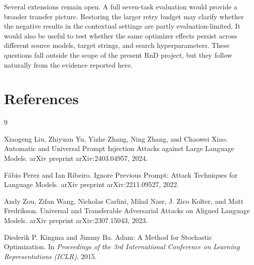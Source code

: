 \documentclass[12pt,a4paper]{report}
\begin{document}
Several extensions remain open. A full seven-task evaluation would provide a broader transfer picture. Restoring the larger retry budget may clarify whether the negative results in the contextual settings are partly evaluation-limited. It would also be useful to test whether the same optimizer effects persist across different source models, target strings, and search hyperparameters. These questions fall outside the scope of the present RnD project, but they follow naturally from the evidence reported here.

\chapter*{References}
\begin{thebibliography}{9}

Xiaogeng Liu, Zhiyuan Yu, Yizhe Zhang, Ning Zhang, and Chaowei Xiao.
\newblock Automatic and Universal Prompt Injection Attacks against Large Language Models.
\newblock arXiv preprint arXiv:2403.04957, 2024.

F\'abio Perez and Ian Ribeiro.
\newblock Ignore Previous Prompt: Attack Techniques for Language Models.
\newblock arXiv preprint arXiv:2211.09527, 2022.

Andy Zou, Zifan Wang, Nicholas Carlini, Milad Nasr, J. Zico Kolter, and Matt Fredrikson.
\newblock Universal and Transferable Adversarial Attacks on Aligned Language Models.
\newblock arXiv preprint arXiv:2307.15043, 2023.

Diederik P. Kingma and Jimmy Ba.
\newblock Adam: A Method for Stochastic Optimization.
\newblock In \emph{Proceedings of the 3rd International Conference on Learning Representations (ICLR)}, 2015.

\end{thebibliography}
\end{document}
